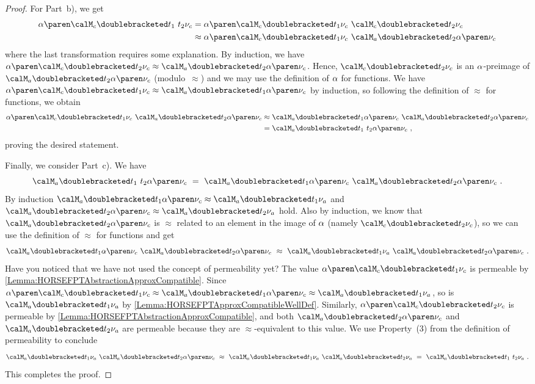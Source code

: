 \documentclass[../../diss.tex]{subfiles}
\begin{document}
\begin{proof}
    For Part~b), we get
    \begin{align*}
        \abs{ \semc{t_1 \appl t_2}{\valc} }
        &= \abs{ \semc{t_1}{\valc} \appl \semc{t_2}{\valc} }
        \\
        &\approx \abs{ \semc{t_1}{\valc} } \appl \sema{t_2}{\abs{\valc}}
    \end{align*}
    where the last transformation requires some explanation.
    By induction, we have $\abs{\semc{t_2}{\valc}} \approx \sema{t_2}{\abs{\valc}}$.
    Hence, $\semc{t_2}{\valc}$ is an $\abs$-preimage of $\sema{t_2}{\abs{\valc}}$ (modulo~$\approx$) and we may use the definition of $\abs$ for functions.
    We have $\abs{ \semc{t_1}{\valc} } \approx \sema{t_1}{\abs{\valc}}$ by induction, so following the definition of $\approx$ for functions, we obtain
    \begin{align*}
        \abs{ \semc{t_1}{\valc} } \appl \sema{t_2}{\abs{\valc}}
        & \approx \sema{t_1}{\abs{\valc}} \appl \sema{t_2}{\abs{\valc}}
        \\
        &= \sema{t_1 \appl t_2}{\abs{\valc}}
        \ ,
    \end{align*}
    proving the desired statement.

    Finally, we consider Part~c).
    We have
    \[
        \sema{t_1 \appl t_2}{\abs{\valc}}
        \ = \
        \sema{t_1}{\abs{\valc}}
        \appl
        \sema{t_2}{\abs{\valc}}
        \ .
    \]
    By induction $\sema{t_1}{\abs{\valc}} \approx \sema{t_1}{\vala}$ and
    $\sema{t_2}{\abs{\valc}} \approx \sema{t_2}{\vala}$ hold.
    Also by induction, we know that $\sema{t_2}{\abs{\valc}}$ is $\approx$ related to an element in the image of $\abs$ (namely $\semc{t_2}{\valc}$), so we can use the definition of $\approx$ for functions and get
    \[
        \sema{t_1}{\abs{\valc}} \appl \sema{t_2}{\abs{\valc}}
        \ \approx \
        \sema{t_1}{\vala} \appl \sema{t_2}{\abs{\valc}}
        \ .
    \]
    Have you noticed that we have not used the concept of permeability yet?
    The value $\abs{\semc{t_1}{\valc}}$ is permeable by \cref{Lemma:HORSEFPTAbstractionApproxCompatible}.
    Since $\abs{\semc{t_1}{\valc}} \approx  \sema{t_1}{\abs{\valc}} \approx \sema{t_1}{\vala}$, so is $\sema{t_1}{\vala}$ by \cref{Lemma:HORSEFPTApproxCompatibleWellDef}.
    Similarly, $\abs{\semc{t_2}{\valc}}$ is permeable by \cref{Lemma:HORSEFPTAbstractionApproxCompatible}, and both $\sema{t_2}{\abs{\valc}}$ and $\sema{t_2}{\vala}$ are permeable because they are $\approx$-equivalent to this value.
    We use Property~(3) from the definition of permeability to conclude
    \[
        \sema{t_1}{\vala} \appl \sema{t_2}{\abs{\valc}}
        \ \approx \
        \sema{t_1}{\vala} \appl \sema{t_2}{\vala}
        \ = \
        \sema{t_1 \appl t_2}{\vala}
        \ .
    \]
    This completes the proof.
\end{proof}
\end{document}
